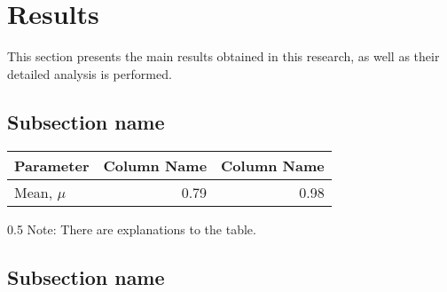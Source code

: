 \section{Results}
\label{sec:Results}

This section presents the main results obtained in this research, as well as their detailed analysis is performed.

\subsection{Subsection name}
\label{sec:}

\begin{table*}[!h]
\caption{An example of a simple table containing descriptive statistics.}
\label{tab:tab_descr_1}
\setlength{\arrayrulewidth}{1.05 pt}
\renewcommand{\arraystretch}{1.1}
\begin{tabular*}{1.0\textwidth}{@{\extracolsep{\fill}}lrr}
\hline
Parameter & Column Name & Column Name \\
\hline
Mean, $\mu$ & 0.79 & 0.98 \\
\hline
\end{tabular*}
\begin{spacing}{0.5}
{\scriptsize Note: There are explanations to the table.}
\end{spacing}
\end{table*}

\subsection{Subsection name}
\label{sec:}

